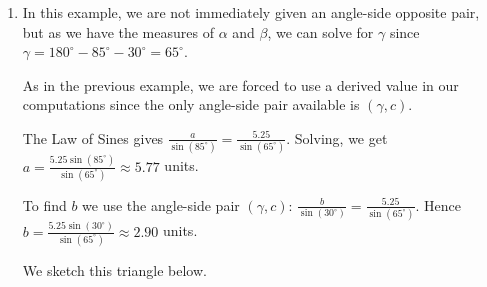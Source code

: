 \documentclass{ximera}
\begin{document}
\begin{example}
\begin{explanation}
\begin{enumerate}
 

We sketch this triangle below on the left.


\item In this example, we are not immediately given an angle-side opposite pair, but as we have the measures of $\alpha$ and $\beta$, we can solve for $\gamma$ since $\gamma = 180^{\circ} - 85^{\circ} - 30^{\circ} = 65^{\circ}$.  

 

As in the previous example, we are forced to use a derived value in our computations since the only angle-side pair available is $(\gamma, c)$. 

 

The Law of Sines gives $\frac{a}{\sin\left(85^{\circ}\right)} = \frac{5.25}{\sin\left(65^{\circ}\right)}$.  Solving, we get $a = \frac{5.25\sin\left(85^{\circ}\right)}{\sin\left(65^{\circ}\right)} \approx 5.77$ units.    

 

To find $b$  we use the angle-side pair $(\gamma,c)$: $\frac{b}{\sin\left(30^{\circ}\right)} = \frac{5.25}{\sin\left(65^{\circ}\right)}$. Hence $b = \frac{5.25\sin\left(30^{\circ}\right)}{\sin\left(65^{\circ}\right)} \approx 2.90$ units. 

 

We sketch this triangle below.

\begin{image}
\end{image}
\end{enumerate}
\end{explanation}
\end{example}
\end{document}
